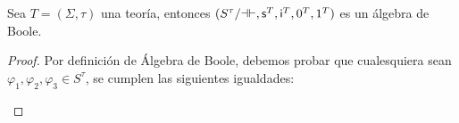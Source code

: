   \begin{lemma} \label{lemma_76}
    \PN Sea $T = (\Sigma, \tau)$ una teoría, entonces $(S^{\tau}/\mathrm{\dashv \vdash}, \mathsf{s}^{T}, \mathsf{i}^{T}, 0^{T},
    1^{T})$ es un álgebra de Boole.
  \end{lemma}
  \begin{proof}
    \PN Por definición de Álgebra de Boole, debemos probar que cualesquiera sean $\varphi_{1}, \varphi_{2}, \varphi_{3}
    \in S^{\tau}$, se cumplen las siguientes igualdades:
    \begin{enumerate}[(1)]

\end{enumerate}
\end{proof}
